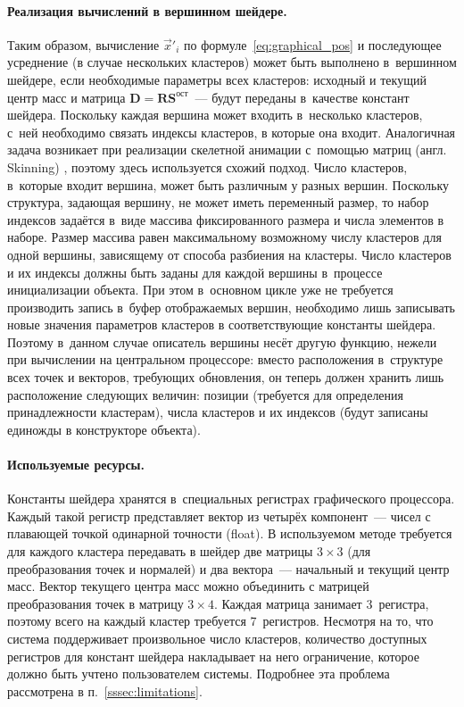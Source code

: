 \documentclass[a4paper, 14pt, titlepage]{extarticle}
\newcommand{\eng}[1]{{\English #1}}
\newcommand{\vect}[1]{\vec{#1}} %
\newcommand{\matx}[1]{\mathbf{#1}} %
\begin{document}
        \paragraph{Реализация вычислений в вершинном шейдере.}
        Таким образом, вычисление $\vect{x}'_i$ по формуле~\eqref{eq:graphical_pos} и последующее
        усреднение (в случае нескольких кластеров) может быть выполнено в~вершинном шейдере, если
        необходимые параметры всех кластеров: исходный и текущий центр масс и матрица $\matx D =
        \matx{R} \matx{S}^{ост}$~--- будут переданы в~качестве констант шейдера. Поскольку каждая
        вершина может входить в~несколько кластеров, с~ней необходимо связать индексы кластеров, в
        которые она входит. Аналогичная задача возникает при реализации скелетной анимации с~помощью
        матриц (англ. \eng{Skinning}) \cite{gpu-gems-skinning}, поэтому здесь используется схожий подход.
        Число кластеров, в~которые входит вершина, может быть различным у разных вершин. Поскольку
        структура, задающая вершину, не может иметь переменный размер, то набор индексов задаётся
        в~виде массива фиксированного размера и числа элементов в наборе. Размер массива равен
        максимальному возможному числу кластеров для одной вершины, зависящему от способа разбиения
        на кластеры. Число кластеров и их индексы должны быть заданы для каждой вершины в~процессе
        инициализации объекта. При этом в~основном цикле уже не требуется
        производить запись в~буфер отображаемых вершин, необходимо лишь записывать новые значения
        параметров кластеров в соответствующие константы шейдера. Поэтому в~данном случае описатель
        вершины несёт другую функцию, нежели при вычислении на центральном процессоре: вместо
        расположения в~структуре всех точек и векторов, требующих обновления, он теперь должен
        хранить лишь расположение следующих величин: позиции (требуется для определения
        принадлежности кластерам), числа кластеров и их индексов (будут записаны единожды в
        конструкторе объекта).

        \paragraph{Используемые ресурсы.}
        Константы шейдера хранятся в~специальных регистрах графического процессора. Каждый такой регистр
        представляет вектор из четырёх компонент~--- чисел с плавающей точкой одинарной точности
        (float). В используемом методе требуется для каждого
        кластера передавать в шейдер две матрицы $3 \times 3$ (для преобразования точек и нормалей) и два
        вектора~--- начальный и текущий центр масс. Вектор текущего центра масс можно объединить с
        матрицей преобразования точек в матрицу $3 \times 4$. Каждая матрица занимает 3~регистра,
        поэтому всего на каждый кластер требуется 7~регистров. Несмотря на то, что система
        поддерживает произвольное число кластеров, количество доступных регистров для констант
        шейдера накладывает на него ограничение, которое должно быть учтено пользователем системы.
        Подробнее эта проблема рассмотрена в п.~\ref{sssec:limitations}.
\end{document}
